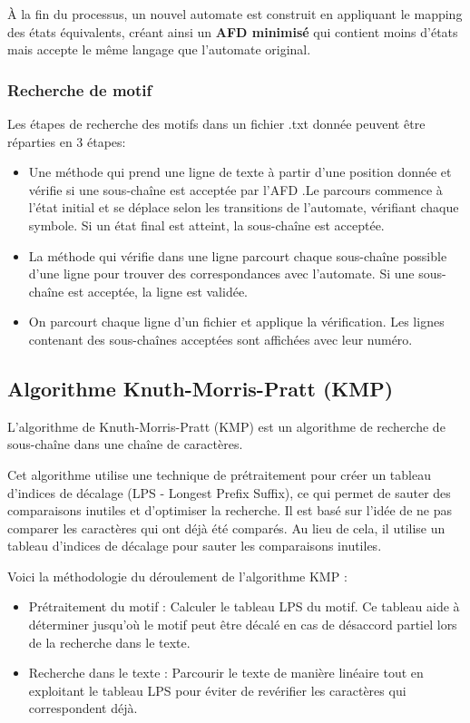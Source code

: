 \documentclass{article}
\begin{document}
À la fin du processus, un nouvel automate est construit en appliquant le mapping des états équivalents, créant ainsi un \textbf{AFD minimisé} qui contient moins d'états mais accepte le même langage que l’automate original.

\subsubsection{Recherche de motif}
Les étapes de recherche des motifs dans un fichier .txt donnée peuvent être réparties en 3 étapes:

\begin{itemize}
    \item Une méthode qui  prend une ligne de texte à partir d'une position donnée et vérifie si une sous-chaîne est acceptée par l'AFD .Le parcours commence à l’état initial et se déplace selon les transitions de l’automate, vérifiant chaque symbole. Si un état final est atteint, la sous-chaîne est acceptée.
    \item La méthode qui vérifie dans une ligne parcourt chaque sous-chaîne possible d’une ligne pour trouver des correspondances avec l’automate. Si une sous-chaîne est acceptée, la ligne est validée.
    \item On parcourt chaque ligne d’un fichier et applique la vérification. Les lignes contenant des sous-chaînes acceptées sont affichées avec leur numéro.
\end{itemize}

\subsection{Algorithme Knuth-Morris-Pratt (KMP)}
L'algorithme de Knuth-Morris-Pratt (KMP) est un algorithme de recherche de sous-chaîne dans une chaîne de caractères.

Cet algorithme utilise une technique de prétraitement pour créer un tableau d'indices de décalage (LPS - Longest Prefix Suffix), ce qui permet de sauter des comparaisons inutiles et d'optimiser la recherche. Il est basé sur l'idée de ne pas comparer les caractères qui ont déjà été comparés. Au lieu de cela, il utilise un tableau d'indices de décalage pour sauter les comparaisons inutiles.

Voici la méthodologie du déroulement de l’algorithme KMP :

\begin{itemize}
    \item Prétraitement du motif : Calculer le tableau LPS du motif. Ce tableau aide à déterminer jusqu'où le motif peut être décalé en cas de désaccord partiel lors de la recherche dans le texte.
    \item Recherche dans le texte : Parcourir le texte de manière linéaire tout en exploitant le tableau LPS pour éviter de revérifier les caractères qui correspondent déjà.
\end{itemize}
\end{document}
